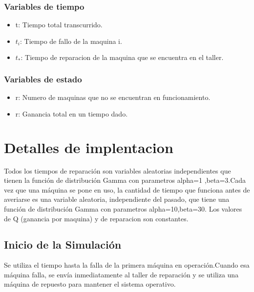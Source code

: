 \documentclass[a4paper,12pt]{article}
\begin{document}
		\subsubsection{Variables de tiempo}
		\begin{itemize}
			\item t: Tiempo total transcurrido.
			\item $t_i$: Tiempo de fallo de la maquina i.
			\item $t_*$: Tiempo de reparacion de la maquina que se encuentra en el taller.
			
		\end{itemize}
		\subsubsection{Variables de estado}
		\begin{itemize}
			\item r: Numero de maquinas que no se encuentran en funcionamiento.
			\item r: Ganancia total en un tiempo dado.
		\end{itemize}
	
	\section{Detalles de implentacion}
	  Todos los tiempos de reparación son variables aleatorias independientes que tienen la función de distribución Gamma con parametros alpha=1 ,beta=3.Cada vez que una máquina se pone en uso, la cantidad de tiempo que funciona antes de averiarse es una variable aleatoria, independiente del pasado, que tiene una función de distribución Gamma con parametros alpha=10,beta=30. Los valores de Q (ganancia por maquina) y de reparacion son constantes.
	
			\subsection{Inicio de la Simulación}
			Se utiliza el tiempo hasta la falla de la primera máquina en operación.Cuando esa máquina falla, se envía inmediatamente al taller de reparación y se utiliza una máquina de repuesto para mantener el sistema operativo.
\end{document}
